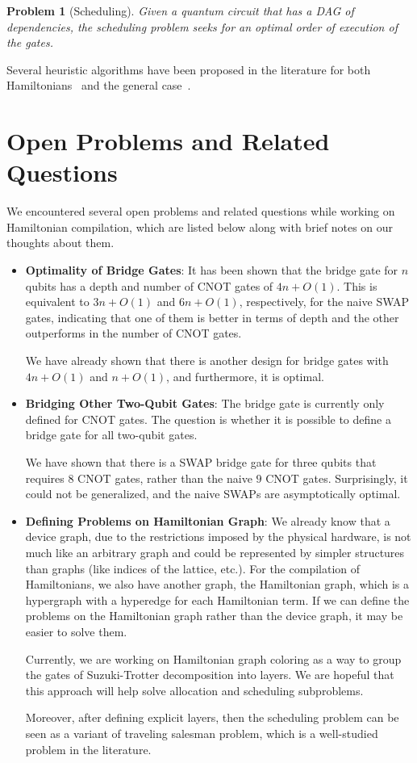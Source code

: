\documentclass{report}
\newtheorem{problem}{Problem}
\begin{document}
\begin{problem}[Scheduling]
  Given a quantum circuit that has a DAG of dependencies, the scheduling problem seeks for an optimal order of execution of the gates.
\end{problem}

Several heuristic algorithms have been proposed in the literature for both Hamiltonians~\cite{lao2021} and the general case~\cite{zhou2020, zulehner2018}.

\chapter{Open Problems and Related Questions}\label{chap:open_problems}

We encountered several open problems and related questions while working on Hamiltonian compilation, which are listed below along with brief notes on our thoughts about them.

\begin{itemize}
  \item \textbf{Optimality of Bridge Gates}: It has been shown that the bridge gate for $n$ qubits has a depth and number of CNOT gates of $4n + O(1)$. This is equivalent to $3n + O(1)$ and $6n + O(1)$, respectively, for the naive SWAP gates, indicating that one of them is better in terms of depth and the other outperforms in the number of CNOT gates.

  We have already shown that there is another design for bridge gates with $4n + O(1)$ and $n + O(1)$, and furthermore, it is optimal.

  \item \textbf{Bridging Other Two-Qubit Gates}: The bridge gate is currently only defined for CNOT gates. The question is whether it is possible to define a bridge gate for all two-qubit gates.
  
  We have shown that there is a SWAP bridge gate for three qubits that requires $8$ CNOT gates, rather than the naive $9$ CNOT gates. Surprisingly, it could not be generalized, and the naive SWAPs are asymptotically optimal.

  \item \textbf{Defining Problems on Hamiltonian Graph}: We already know that a device graph, due to the restrictions imposed by the physical hardware, is not much like an arbitrary graph and could be represented by simpler structures than graphs (like indices of the lattice, etc.). For the compilation of Hamiltonians, we also have another graph, the Hamiltonian graph, which is a hypergraph with a hyperedge for each Hamiltonian term. If we can define the problems on the Hamiltonian graph rather than the device graph, it may be easier to solve them. 

  Currently, we are working on Hamiltonian graph coloring as a way to group the gates of Suzuki-Trotter decomposition into layers. We are hopeful that this approach will help solve 
  allocation and scheduling subproblems.

  Moreover, after defining explicit layers, then the scheduling problem can be seen as a variant of traveling salesman problem, which is a well-studied problem in the literature.
\end{itemize}
\end{document}
